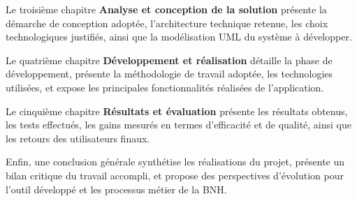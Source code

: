\medskip

Le troisième chapitre \og \textbf{Analyse et conception de la solution} \fg présente la démarche de conception adoptée, l'architecture technique retenue, les choix technologiques justifiés, ainsi que la modélisation UML du système à développer.

\medskip

Le quatrième chapitre \og \textbf{Développement et réalisation} \fg détaille la phase de développement, présente la méthodologie de travail adoptée, les technologies utilisées, et expose les principales fonctionnalités réalisées de l'application.

\medskip

Le cinquième chapitre \og \textbf{Résultats et évaluation} \fg présente les résultats obtenus, les tests effectués, les gains mesurés en termes d'efficacité et de qualité, ainsi que les retours des utilisateurs finaux.

\medskip

Enfin, une conclusion générale synthétise les réalisations du projet, présente un bilan critique du travail accompli, et propose des perspectives d'évolution pour l'outil développé et les processus métier de la BNH.